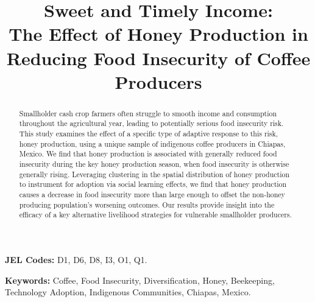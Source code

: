 \begin{titlepage}

\title{Sweet and Timely Income: \\
The Effect of Honey Production in Reducing Food Insecurity of Coffee Producers}


\maketitle

\begin{abstract}
Smallholder cash crop farmers often struggle to smooth income and consumption throughout the agricultural year, leading to potentially serious food insecurity risk. This study examines the effect of a specific type of adaptive response to this risk, honey production, using a unique sample of indigenous coffee producers in Chiapas, Mexico. We find that honey production is associated with generally reduced food insecurity during the key honey production season, when food insecurity is otherwise generally rising. Leveraging  clustering in the spatial distribution of honey production to instrument for adoption via social learning effects, we find that honey production causes a decrease in food insecurity more than large enough to offset the non-honey producing population's worsening outcomes. Our results provide insight into the efficacy of a key alternative livelihood strategies for vulnerable smallholder producers. 


\end{abstract}

\vspace{1cm} 
\textbf{\small{}JEL Codes:}{\small{} D1, D6, D8, I3, O1, Q1.}{\small\par}

\textbf{\small{}Keywords:}{\small{} Coffee, Food Insecurity, Diversification, Honey, Beekeeping, Technology Adoption, Indigenous Communities, Chiapas, Mexico.}{\small\par}

\thispagestyle{empty} 

\end{titlepage}
